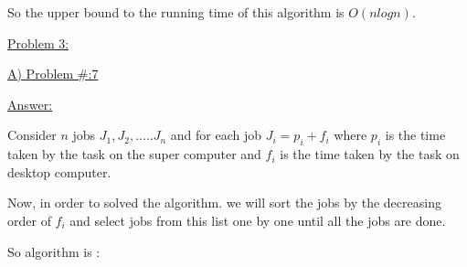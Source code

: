 \documentclass[letterpaper,portrait,12pt]{article}
\begin{document}
\begin{flushleft}

\end{flushleft}


\begin{flushleft}
So the upper bound to the running time of this algorithm is $O(nlogn)$.
\end{flushleft}


\begin{flushleft}

\end{flushleft}


\begin{flushleft}

\end{flushleft}


\begin{flushleft}
\uline{Problem 3:}
\end{flushleft}


\begin{flushleft}
\uline{A)}\uline{ Pro}\uline{blem \#:7}\uline{ }
\end{flushleft}


\begin{flushleft}
\uline{Ans}\uline{wer: }
\end{flushleft}


\begin{flushleft}
Consider $n$ jobs $J_1,J_2,.....J_n$ and for each job $J_i = p_i + f_i$ where $p_i$ is the time taken by the task on the super computer and $f_i$ is the time taken by the task on desktop computer.
\end{flushleft}


\begin{flushleft}

\end{flushleft}


\begin{flushleft}
Now, in order to solved the algorithm. we will sort the jobs by the decreasing order of $f_i$ and select jobs from this list one by one until all the jobs are done.
\end{flushleft}


\begin{flushleft}

\end{flushleft}


\begin{flushleft}
So algorithm is :
\end{flushleft}
\end{document}

